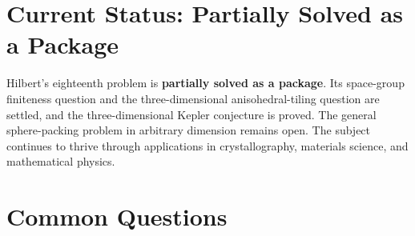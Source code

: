 \section{Current Status: Partially Solved as a Package}

\begin{solvedbox}
Hilbert's eighteenth problem is \textbf{partially solved as a package}. Its space-group finiteness question and the three-dimensional anisohedral-tiling question are settled, and the three-dimensional Kepler conjecture is proved. The general sphere-packing problem in arbitrary dimension remains open. The subject continues to thrive through applications in crystallography, materials science, and mathematical physics.
\end{solvedbox}

\section*{Common Questions}

